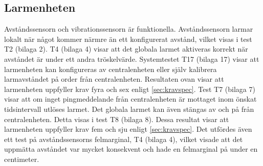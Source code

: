 \subsection{Larmenheten}
Avståndssensorn och vibrationssensorn är funktionella. Avståndssensorn larmar lokalt när något kommer närmre än ett konfigurerat avstånd, vilket visas i test T2 (bilaga 2). T4 (bilaga 4) visar att det globala larmet aktiveras korrekt när avståndet är under ett andra tröskelvärde. Systemtestet T17 (bilaga 17) visar att larmenheten kan konfigureras av centralenheten eller själv kalibrera larmavståndet på order från centralenheten. Resultaten ovan visar att larmenheten uppfyller krav fyra och sex enligt \ref{sec:kravspec}.
\newline\newline
Test T7 (bilaga 7) visar att om inget pingmeddelande från centralenheten är mottaget inom önskat tidsintervall utlöses larmet. Det globala larmet kan även stängas av och på från centralenheten. Detta visas i test T8 (bilaga 8). Dessa resultat visar att larmenheten uppfyller krav fem och sju enligt \ref{sec:kravspec}.
\newline\newline
Det utfördes även ett test på avståndssensorns felmarginal, T4 (bilaga 4), vilket visade att det uppmätta avståndet var mycket konsekvent och hade en felmarginal på under en centimeter.
